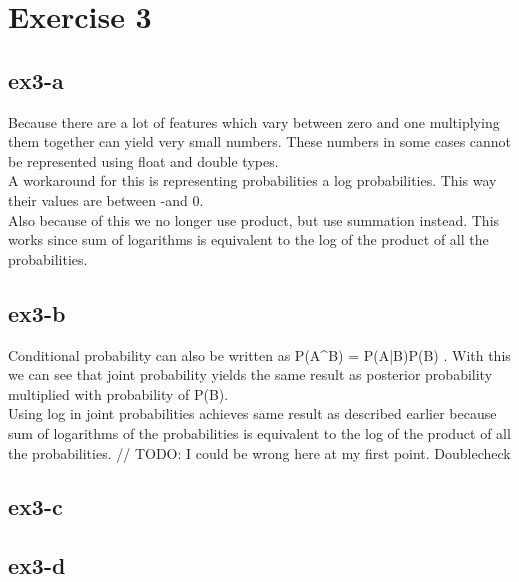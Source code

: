 \section{Exercise 3}
\subsection{ex3-a}
Because there are a lot of features which vary between zero and one multiplying them together can yield very small
numbers. These numbers in some cases cannot be represented using float and double types.\\
A workaround for this is representing probabilities a log probabilities. This way their values are between -\infty and 0.\\
Also because of this we no longer use product, but use summation instead. This works since sum of logarithms is
equivalent to the log of the product of all the probabilities.

\subsection{ex3-b}
Conditional probability can also be written as P(A^B) = P(A|B)P(B) . With this we can see that joint probability yields
the same result as posterior probability multiplied with probability of P(B). \\
Using log in joint probabilities achieves same result as described earlier because sum of logarithms of the
probabilities is equivalent to the log of the product of all the probabilities.
//
TODO: I could be wrong here at my first point. Doublecheck

\subsection{ex3-c}

\subsection{ex3-d}
